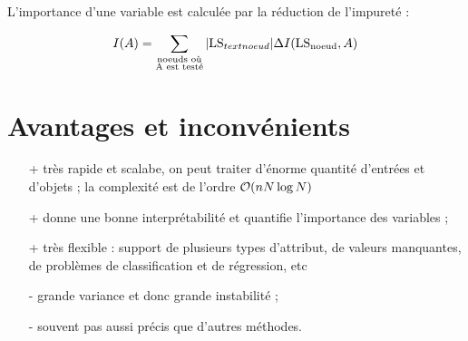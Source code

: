 	L'importance d'une variable est calculée par la réduction de l'impureté :
	
	$$I(A) = \sum_{\substack{\text{noeuds où} \\ \text{A est testé}}} \vert \text{LS}_{text{noeud}} \vert \Delta I(\text{LS}_{\text{noeud}}, A)$$
	
	
	\section{Avantages et inconvénients}
	
	\begin{itemize}
		\item[+] très rapide et scalabe, on peut traiter d'énorme quantité d'entrées et d'objets ; la complexité est de l'ordre $\mathcal{O} (nN\log N)$
		\item[+] donne une bonne interprétabilité et quantifie l'importance des variables ;
		\item[+] très flexible : support de plusieurs types d'attribut, de valeurs manquantes, de problèmes de classification et de régression, etc
		\item[-] grande variance et donc grande instabilité ;
		\item[-] souvent pas aussi précis que d'autres méthodes.
	\end{itemize}
	

